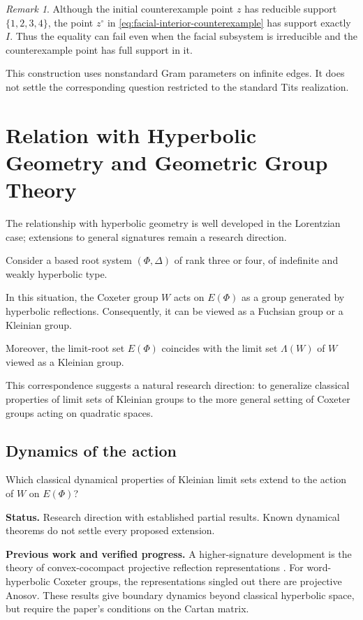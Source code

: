 \documentclass[11pt,reqno]{amsart}
\theoremstyle{plain}
\theoremstyle{definition}
\theoremstyle{remark}
\newtheorem{remark}[theorem]{Remark}
\numberwithin{equation}{section}
\begin{document}
\begin{remark}
Although the initial counterexample point $z$ has reducible
support $\{1,2,3,4\}$, the point $z^\circ$ in
\eqref{eq:facial-interior-counterexample} has support exactly $I$.
Thus the equality can fail even when the facial subsystem is
irreducible and the counterexample point has full support in it.

This construction uses nonstandard Gram parameters on infinite
edges. It does not settle the corresponding question restricted
to the standard Tits realization.
\end{remark}

\section{Relation with Hyperbolic Geometry and Geometric Group Theory}

The relationship with hyperbolic geometry is well developed in the
Lorentzian case; extensions to general signatures remain a research direction.

Consider a based root system $(\Phi,\Delta)$ of rank
three or four, of indefinite and weakly hyperbolic type.

In this situation, the Coxeter group $W$ acts on
$E(\Phi)$ as a group generated by hyperbolic reflections.
Consequently, it can be viewed as a Fuchsian group or
a Kleinian group.

Moreover, the limit-root set $E(\Phi)$ coincides with
the limit set $\Lambda(W)$ of $W$ viewed as a Kleinian
group.

This correspondence suggests a natural research
direction: to generalize classical properties of limit
sets of Kleinian groups to the more general setting
of Coxeter groups acting on quadratic spaces.

\subsection{Dynamics of the action}
Which classical dynamical properties of Kleinian limit sets extend
to the action of $W$ on $E(\Phi)$?


\par\medskip
\noindent\textbf{Status.} Research direction with established partial results. Known dynamical theorems do not settle every proposed extension.

\par\medskip
\noindent\textbf{Previous work and verified progress.}
A higher-signature development is the theory of convex-cocompact
projective reflection representations \cite{DGKLM2025}. For word-hyperbolic
Coxeter groups, the representations singled out there are projective
Anosov. These results give boundary dynamics beyond classical hyperbolic
space, but require the paper's conditions on the Cartan matrix.
\end{document}
